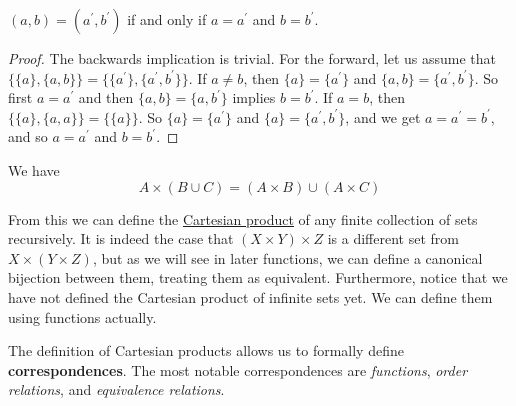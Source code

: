   \begin{theorem}
    \label{thm:characteristic-property-of-ordered-pairs}
    $(a, b) = (a^\prime, b^\prime)$ if and only if $a = a^\prime$ and $b = b^\prime$. 
  \end{theorem}
  \begin{proof}
    The backwards implication is trivial. For the forward, let us assume that $\{\{a\}, \{a, b\}\} = \{\{a^\prime\}, \{a^\prime, b^\prime\}\}$. If $a \neq b$, then $\{a\} = \{a^\prime\}$ and $\{a, b\} = \{a^\prime, b^\prime\}$. So first $a = a^\prime$ and then $\{a, b\} = \{a, b^\prime\}$ implies $b = b^\prime$. If $a = b$, then $\{\{a\}, \{a, a\}\} = \{\{a\}\}$. So $\{a\} = \{a^\prime\}$ and $\{a\} = \{a^\prime, b^\prime\}$, and we get $a = a^\prime = b^\prime$, and so $a = a^\prime$ and $b = b^\prime$. 
  \end{proof}

  \begin{theorem}
    \label{thm:products-distribute-over-unions}
    We have 
    \begin{equation}
      A \times (B \cup C) = (A \times B) \cup (A \times C)
    \end{equation}
  \end{theorem}

  From this we can define the \hyperref[def:cart-prod]{Cartesian product} of any finite collection of sets recursively. It is indeed the case that $(X \times Y) \times Z$ is a different set from $X \times (Y \times Z)$, but as we will see in later functions, we can define a canonical bijection between them, treating them as equivalent. Furthermore, notice that we have not defined the Cartesian product of infinite sets yet. We can define them using functions actually. 

  The definition of Cartesian products allows us to formally define \textbf{correspondences}. The most notable correspondences are \textit{functions}, \textit{order relations}, and \textit{equivalence relations}. 

